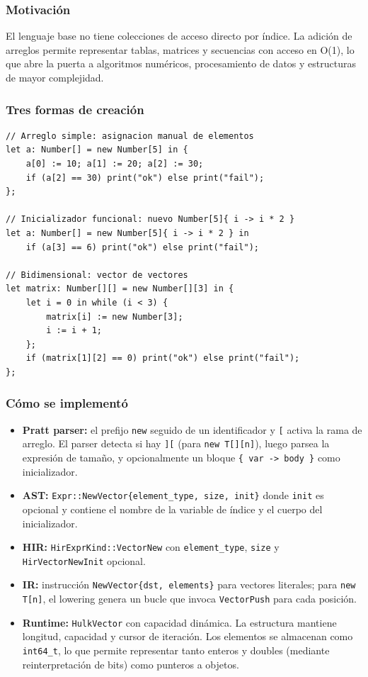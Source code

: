 \documentclass[12pt,letterpaper]{article}
\newcommand{\src}[1]{\texttt{#1}}
\begin{document}
\subsubsection{Motivación}

El lenguaje base no tiene colecciones de acceso directo por índice. La adición de arreglos permite representar tablas, matrices y secuencias con acceso en O(1), lo que abre la puerta a algoritmos numéricos, procesamiento de datos y estructuras de mayor complejidad.

\subsubsection{Tres formas de creación}

\begin{lstlisting}[language=HULK,caption={Arreglo simple, con inicializador y bidimensional}]
// Arreglo simple: asignacion manual de elementos
let a: Number[] = new Number[5] in {
    a[0] := 10; a[1] := 20; a[2] := 30;
    if (a[2] == 30) print("ok") else print("fail");
};

// Inicializador funcional: nuevo Number[5]{ i -> i * 2 }
let a: Number[] = new Number[5]{ i -> i * 2 } in
    if (a[3] == 6) print("ok") else print("fail");

// Bidimensional: vector de vectores
let matrix: Number[][] = new Number[][3] in {
    let i = 0 in while (i < 3) {
        matrix[i] := new Number[3];
        i := i + 1;
    };
    if (matrix[1][2] == 0) print("ok") else print("fail");
};
\end{lstlisting}

\subsubsection{Cómo se implementó}

\begin{itemize}
    \item \textbf{Pratt parser:} el prefijo \src{new} seguido de un identificador y \src{[} activa la rama de arreglo. El parser detecta si hay \src{][} (para \src{new T[][n]}), luego parsea la expresión de tamaño, y opcionalmente un bloque \src{\{ var -> body \}} como inicializador.
    \item \textbf{AST:} \src{Expr::NewVector\{element\_type, size, init\}} donde \src{init} es opcional y contiene el nombre de la variable de índice y el cuerpo del inicializador.
    \item \textbf{HIR:} \src{HirExprKind::VectorNew} con \src{element\_type}, \src{size} y \src{HirVectorNewInit} opcional.
    \item \textbf{IR:} instrucción \src{NewVector\{dst, elements\}} para vectores literales; para \src{new T[n]}, el lowering genera un bucle que invoca \src{VectorPush} para cada posición.
    \item \textbf{Runtime:} \src{HulkVector} con capacidad dinámica. La estructura mantiene longitud, capacidad y cursor de iteración. Los elementos se almacenan como \src{int64\_t}, lo que permite representar tanto enteros y doubles (mediante reinterpretación de bits) como punteros a objetos.
\end{itemize}
\end{document}
